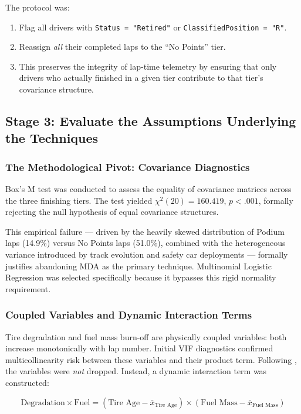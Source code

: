 The protocol was:
\begin{enumerate}
  \item Flag all drivers with \texttt{Status = "Retired"} or
    \texttt{ClassifiedPosition = "R"}.
  \item Reassign \textit{all} their completed laps to the ``No Points'' tier.
  \item This preserves the integrity of lap-time telemetry by ensuring that
    only drivers who actually finished in a given tier contribute to that
    tier's covariance structure.
\end{enumerate}

\subsection{Stage 3: Evaluate the Assumptions Underlying the Techniques}

\subsubsection{The Methodological Pivot: Covariance Diagnostics}

Box's M test was conducted to assess the equality of covariance matrices
across the three finishing tiers. The test yielded
$\chi^{2}(20) = 160.419$, $p < .001$, formally rejecting the null
hypothesis of equal covariance structures.

This empirical failure --- driven by the heavily skewed distribution of
Podium laps (14.9\%) versus No Points laps (51.0\%), combined with the
heterogeneous variance introduced by track evolution and safety car
deployments --- formally justifies abandoning MDA as the primary technique.
Multinomial Logistic Regression was selected specifically because it
bypasses this rigid normality requirement.

\subsubsection{Coupled Variables and Dynamic Interaction Terms}

Tire degradation and fuel mass burn-off are physically coupled variables:
both increase monotonically with lap number. Initial VIF diagnostics
confirmed multicollinearity risk between these variables and their product
term. Following \textcite{hair2019}, the variables were \textit{not}
dropped. Instead, a dynamic interaction term was constructed:

\[
  \text{Degradation} \times \text{Fuel} =
  (\text{Tire Age} - \bar{x}_{\text{Tire Age}}) \times
  (\text{Fuel Mass} - \bar{x}_{\text{Fuel Mass}})
\]

